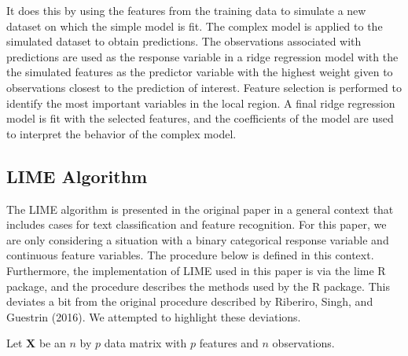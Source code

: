 \documentclass[AMS,STIX2COL]{WileyNJD-v2}
\begin{document}
It does this by using the features from the training data to simulate a new dataset on which the simple model is fit. The complex model is applied to the simulated dataset to obtain predictions. The observations associated with predictions are used as the response variable in a ridge regression model with the the simulated features as the predictor variable with the highest weight given to observations closest to the prediction of interest. Feature selection is performed to identify the most important variables in the local region. A final ridge regression model is fit with the selected features, and the coefficients of the model are used to interpret the behavior of the complex model.

\subsection{LIME Algorithm}

The LIME algorithm is presented in the original paper in a general context that includes cases for text classification and feature recognition. For this paper, we are only considering a situation with a binary categorical response variable and continuous feature variables. The procedure below is defined in this context. Furthermore, the implementation of LIME used in this paper is via the lime R package, and the procedure describes the methods used by the R package. This deviates a bit from the original procedure described by Riberiro, Singh, and Guestrin (2016). We attempted to highlight these deviations.

Let $\textbf{X}$ be an $n$ by $p$ data matrix with $p$ features and $n$ observations.
\end{document}

